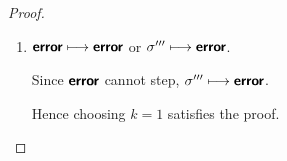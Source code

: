 \begin{proof}
\begin{enumerate}
\begin{itemize}
\begin{enumerate}
        Hence $\conf''' \ctxstepsto^{j''} \error$.


        Since $j'' \leq 1$, choosing $k = j''$ satisfies the proof.

      \item $\textbf{\textsf{error}} \longmapsto \textbf{\textsf{error}}$ or $\sigma''' \longmapsto
        \textbf{\textsf{error}}$.

        Since $\textbf{\textsf{error}}$ cannot step, $\sigma''' \longmapsto \textbf{\textsf{error}}$.

        Hence choosing $k = 1$ satisfies the proof.

      \end{enumerate}

    \end{itemize}

  \end{enumerate}

\end{proof}
